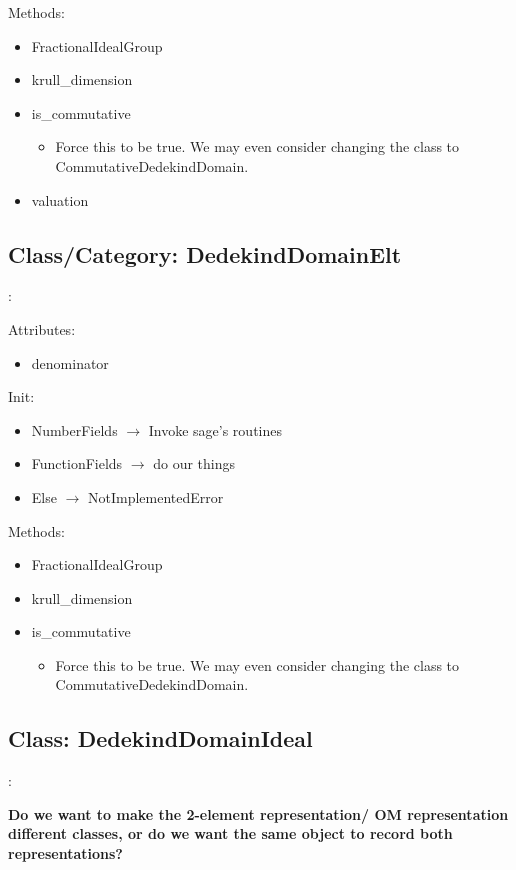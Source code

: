 \documentclass{amsart}
\theoremstyle{definition}
\begin{document}
		Methods:
		\begin{itemize}
			\item 
			FractionalIdealGroup
			\item
			krull\_dimension
			\item
			is\_commutative
			\begin{itemize}
				\item
					Force this to be true. We may even consider changing the class to CommutativeDedekindDomain.
			\end{itemize}
			\item
			valuation
		\end{itemize}

	\subsection{Class/Category: DedekindDomainElt}: \newline
	
	Attributes:
	\begin{itemize}
		\item 
		denominator
	\end{itemize}
	
	Init:
	\begin{itemize}
		\item
		NumberFields $\rightarrow$ Invoke sage's routines
		\item
		FunctionFields $\rightarrow$ do our things
		\item
		Else $\rightarrow$ NotImplementedError
	\end{itemize}
	
	Methods:
	\begin{itemize}
		\item 
		FractionalIdealGroup
		\item
		krull\_dimension
		\item
		is\_commutative
		\begin{itemize}
			\item
			Force this to be true. We may even consider changing the class to CommutativeDedekindDomain.
		\end{itemize}
	\end{itemize}

	\subsection{Class: DedekindDomainIdeal}: \newline
	
	{\bf Do we want to make the 2-element representation/ OM representation different classes, or do we want the same object to record both representations?} \newline
	
\end{document}
